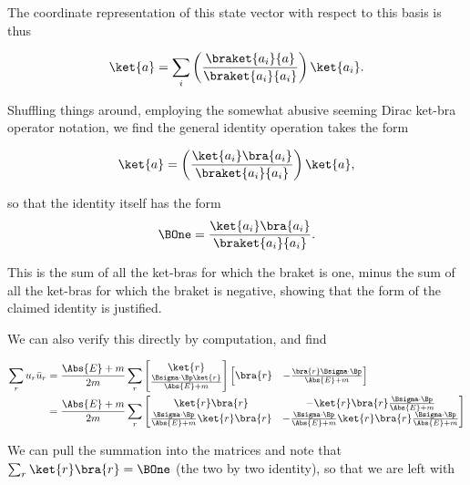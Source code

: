 The coordinate representation of this state vector with respect to this basis is thus

\begin{equation}\label{eqn:desaiDiracAdjoint:620}
\ket{a} 
= 
\sum_i \left( \frac{\braket{a_i}{a}}{\braket{a_i}{a_i}} \right)
\ket{a_i}.
\end{equation}

Shuffling things around, employing the somewhat abusive seeming Dirac ket-bra operator notation, we find the general identity operation takes the form

\begin{equation}\label{eqn:desaiDiracAdjoint:640}
\ket{a} = \left( \frac{\ket{a_i} \bra{a_i} }{\braket{a_i}{a_i}} \right) \ket{a},
\end{equation}

so that the identity itself has the form
\begin{equation}\label{eqn:desaiDiracAdjoint:660}
\BOne = \frac{\ket{a_i} \bra{a_i} }{\braket{a_i}{a_i}}.
\end{equation}

This is the sum of all the ket-bras for which the braket is one, minus the sum of all the ket-bras for which the braket is negative, showing that the form of the claimed identity is justified.

We can also verify this directly by computation, and find

\begin{align*}
\sum_r u_r \bar{u}_r 
&=
\frac{\Abs{E} + m}{2m}
\sum_r 
\begin{bmatrix}
\ket{r} \\
\frac{\Bsigma \cdot \Bp \ket{r}}{\Abs{E} + m}
\end{bmatrix}
\begin{bmatrix}
\bra{r} &
-\frac{\bra{r} \Bsigma \cdot \Bp}{\Abs{E} + m}
\end{bmatrix} \\
&=
\frac{\Abs{E} + m}{2m}
\sum_r 
\begin{bmatrix}
\ket{r}\bra{r} & -\ket{r}\bra{r} \frac{\Bsigma \cdot \Bp}{\Abs{E} + m} \\
\frac{\Bsigma \cdot \Bp}{\Abs{E} + m} \ket{r}\bra{r} &
-\frac{\Bsigma \cdot \Bp}{\Abs{E} + m} \ket{r}\bra{r} \frac{\Bsigma \cdot \Bp}{\Abs{E} + m}  \\
\end{bmatrix}
\end{align*}

We can pull the summation into the matrices and note that $\sum_r \ket{r}\bra{r} = \BOne$ (the two by two identity), so that we are left with

